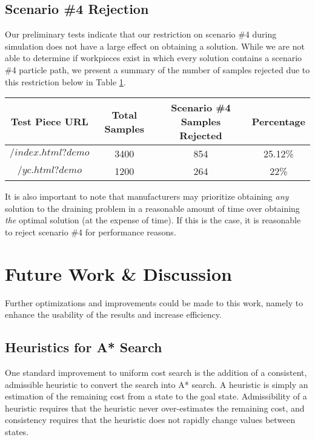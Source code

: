  \subsection{Scenario \#4 Rejection}

Our preliminary tests indicate that our restriction on scenario \#4 during simulation does not have a large effect on obtaining a solution. While we are not able to determine if workpieces exist in which every solution contains a scenario \#4 particle path, we present a summary of the number of samples rejected due to this restriction below in Table \ref{scenario4rejects}.

\begin{table}[H]\label{scenario4rejects}
\begin{tabular}{|c|c|c|c|}
\hline
Test Piece URL & Total Samples & Scenario \#4 Samples Rejected & Percentage \\ \hline
$/index.html?demo$ & 3400 & 854 & 25.12\%\\
$/yc.html?demo$ & 1200 & 264 & 22\% \\
\end{tabular}
\end{table}

It is also important to note that manufacturers may prioritize obtaining \emph{any} solution to the draining problem in a reasonable amount of time over obtaining \emph{the} optimal solution (at the expense of time). If this is the case, it is reasonable to reject scenario \#4 for performance reasons.

\section{Future Work \& Discussion}

Further optimizations and improvements could be made to this work, namely to enhance the usability of the results and increase efficiency.

  \subsection{Heuristics for A* Search}

One standard improvement to uniform cost search is the addition of a consistent, admissible heuristic to convert the search into A* search. A heuristic is simply an estimation of the remaining cost from a state to the goal state. Admissibility of a heuristic requires that the heuristic never over-estimates the remaining cost, and consistency requires that the heuristic does not rapidly change values between states.

